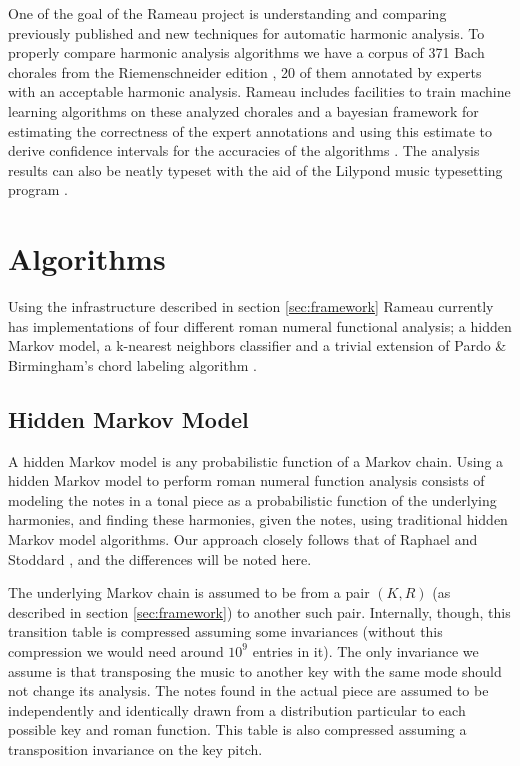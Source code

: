 
One of the goal of the Rameau project is understanding and comparing
previously published and new techniques for automatic harmonic
analysis. To properly compare harmonic analysis algorithms we have a
corpus of 371 Bach chorales from the Riemenschneider edition
\cite{bach41:371}, 20 of them annotated by experts with an acceptable
harmonic analysis. Rameau includes facilities to train machine
learning algorithms on these analyzed chorales and a bayesian
framework for estimating the correctness of the expert annotations and
using this estimate to derive confidence intervals for the accuracies
of the algorithms . The analysis results can
also be neatly typeset with the aid of the Lilypond music typesetting
program \cite{nienhuys.ea08:lilypond}.

\section{Algorithms}
\label{sec:algorithms}

Using the infrastructure described in section \ref{sec:framework}
Rameau currently has implementations of four different roman numeral
functional analysis; a hidden Markov model, a k-nearest neighbors
classifier and a trivial extension of Pardo \& Birmingham's chord
labeling algorithm \cite{pardo.ea99:automated}.

\subsection{Hidden Markov Model}
\label{sec:hidden-markov-model}

A hidden Markov model is any probabilistic function of a Markov
chain. Using a hidden Markov model to perform roman numeral function
analysis consists of modeling the notes in a tonal piece as a
probabilistic function of the underlying harmonies, and finding these
harmonies, given the notes, using traditional hidden Markov model
algorithms. Our approach closely follows that of Raphael and Stoddard
\cite{raphael.ea03:harmonic}, and the differences will be noted here.

The underlying Markov chain is assumed to be from a pair $(K,R)$ (as
described in section \ref{sec:framework}) to another such
pair. Internally, though, this transition table is compressed assuming
some invariances (without this compression we would need around $10^9$
entries in it). The only invariance we assume is that transposing the
music to another key with the same mode should not change its
analysis. The notes found in the actual piece are assumed to be
independently and identically drawn from a distribution particular to
each possible key and roman function. This table is also compressed
assuming a transposition invariance on the key pitch. 

